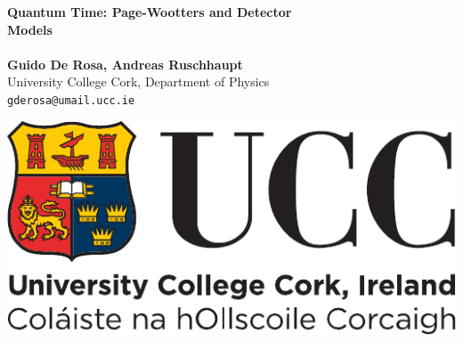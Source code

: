 \documentclass[a0,portrait]{a0poster}
\begin{document}
\begin{minipage}[c]{0.70\linewidth}%
\veryHuge \color{NavyBlue} \textbf{Quantum Time: Page-Wootters and Detector\\[0.5cm] Models} \color{Black}\\[0.5cm] %
\\[0.7cm]
\LARGE \textbf{Guido De Rosa, Andreas Ruschhaupt}\\[0.5cm] %
\huge University College Cork, Department of Physics\\[0.4cm] %
\large%
\texttt{gderosa@umail.ucc.ie}
\end{minipage}%
%
\begin{minipage}[t]{0.25\linewidth}
\hspace{3cm}\includegraphics[width=16cm]{ucc_logo.pdf}\\  %
\end{minipage}

\vspace{2cm} %

\end{document}
